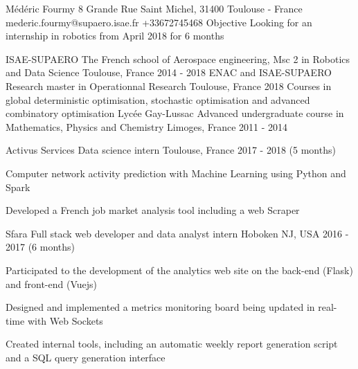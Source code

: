 \documentclass[11pt, a4paper, final]{resume}
\begin{document}
	\header
		{Médéric}
		{Fourmy}
		{8 Grande Rue Saint Michel, 31400 Toulouse - France}
		{mederic.fourmy@supaero.isae.fr}
		{+33672745468}
		{Objective}
		{Looking for an internship in robotics from April 2018 for 6 months}

	\begin{cventries}
		\cventry
		{ISAE-SUPAERO}
		{The French school of Aerospace engineering, Msc 2 in Robotics and Data Science}
		{Toulouse, France}
		{2014 - 2018}
		{}
		\cventry
		{ENAC and ISAE-SUPAERO}
		{Research master in Operationnal Research}
		{Toulouse, France}
		{2018}
		{Courses in global deterministic optimisation, stochastic optimisation and advanced combinatory optimisation}
		\cventry
		{Lycée Gay-Lussac}
		{Advanced undergraduate course in Mathematics, Physics and Chemistry}
		{Limoges, France}
		{2011 - 2014}
		{}
	\end{cventries}

	\cvsection{Work experience}
	\begin{cventries}
		\cventry
		{Activus Services}
		{Data science intern}
		{Toulouse, France}
		{2017 - 2018 (5 months)}
		{
			\begin{cvitems}{}
				\item Computer network activity prediction with Machine Learning using Python and Spark
				\item Developed a French job market analysis tool including a web Scraper
			\end{cvitems}
		}
		\cventry
		{Sfara}
		{Full stack web developer and data analyst intern}
		{Hoboken NJ, USA}
		{2016 - 2017 (6 months)}
		{
			\begin{cvitems}{}
				\item Participated to the development of the analytics web site on the back-end (Flask) and front-end (Vuejs)
				\item Designed and implemented a metrics monitoring board being updated in real-time with Web Sockets
				\item Created internal tools, including an automatic weekly report generation script and a SQL query generation interface
			\end{cvitems}
		}
	\end{cventries}
\end{document}

